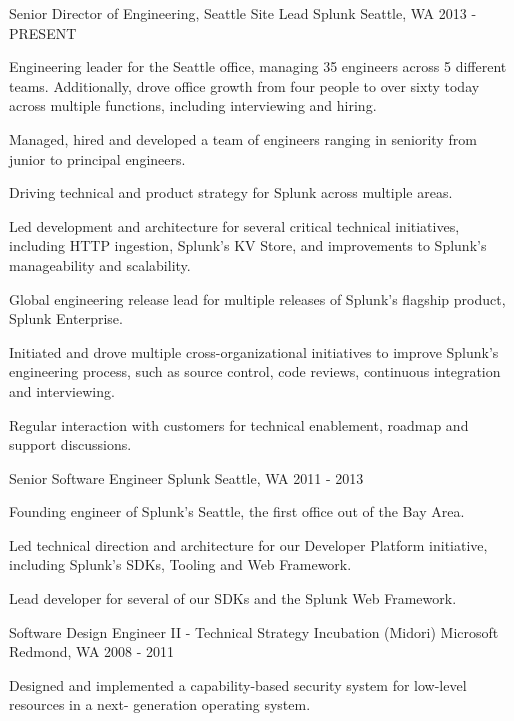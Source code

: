 \begin{cventries}
  \cventry
    {Senior Director of Engineering, Seattle Site Lead}
    {Splunk}
    {Seattle, WA}
    {2013 - PRESENT}
    {
      \begin{cvitems}
        \item {Engineering leader for the Seattle office, managing 35 engineers across 5 different teams. Additionally, drove office growth from four people to over sixty today across multiple functions, including interviewing and hiring.}
        \item {Managed, hired and developed a team of engineers ranging in seniority from junior to principal engineers.}
        \item {Driving technical and product strategy for Splunk across multiple areas.}
        \item {Led development and architecture for several critical technical initiatives, including HTTP ingestion, Splunk's KV Store, and improvements to Splunk's manageability and scalability.}
        \item {Global engineering release lead for multiple releases of Splunk's flagship product, Splunk Enterprise.}
        \item {Initiated and drove multiple cross-organizational initiatives to improve Splunk's engineering process, such as source control, code reviews, continuous integration and interviewing.}
        \item {Regular interaction with customers for technical enablement, roadmap and support discussions.}
      \end{cvitems}
    }
  \cventry
    {Senior Software Engineer}
    {Splunk}
    {Seattle, WA}
    {2011 - 2013}
    {
      \begin{cvitems}
        \item {Founding engineer of Splunk's Seattle, the first office out of the Bay Area.}
        \item {Led technical direction and architecture for our Developer Platform initiative, including Splunk's SDKs, Tooling and Web Framework.}
        \item {Lead developer for several of our SDKs and the Splunk Web Framework.}
      \end{cvitems}
    }
  \cventry
    {Software Design Engineer II - Technical Strategy Incubation (Midori)}
    {Microsoft}
    {Redmond, WA}
    {2008 - 2011}
    {
      \begin{cvitems}
        \item {Designed and implemented a capability-based security system for low-level resources in a next- generation operating system.}

\end{cvitems}}
\end{cventries}
